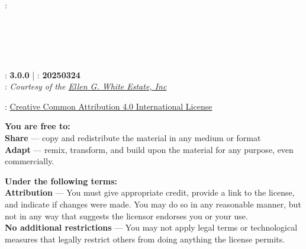 \clearpage %

{\small
\setlength{\parindent}{0em}\setlength{\parskip}{1em}

{\large \emcap{\booktitle}}

: \textbf{\authorname} \\
\ifx\editor\undefined\else\if\relax\detokenize\expandafter{\editor}\relax{} \\ \fi\fi
\ifx\translatedby\undefined\else\if\relax\detokenize\expandafter{\translatedby}\relax{} \\ \fi\fi
\ifx\publisher\undefined\else\if\relax\detokenize\expandafter{\publisher}\relax{} \\ \fi\fi
\ifx\publishingplace\undefined\else\if\relax\detokenize\expandafter{\publishingplace}\relax{} \\ \fi\fi
\ifx\isbn\undefined\else\if\relax\detokenize\expandafter{\isbn}\relax{} \\ \fi\fi
{}: \textbf{3.0.0} | : \textbf{20250324} \\
: \textit{Courtesy of the \href{https://ellenwhite.org/}{Ellen G. White Estate, Inc}}

\vfill

: \ccby{} \href{https://creativecommons.org/licenses/by/4.0/}{Creative Common Attribution 4.0 International License}

\textbf{You are free to:} \\
\textbf{Share} — copy and redistribute the material in any medium or format \\
\textbf{Adapt} — remix, transform, and build upon the material for any purpose, even commercially.

\textbf{Under the following terms:} \\
\textbf{Attribution} — You must give appropriate credit, provide a link to the license, and indicate if changes were made. You may do so in any reasonable manner, but not in any way that suggests the licensor endorses you or your use. \\
\textbf{No additional restrictions} — You may not apply legal terms or technological measures that legally restrict others from doing anything the license permits.


}
